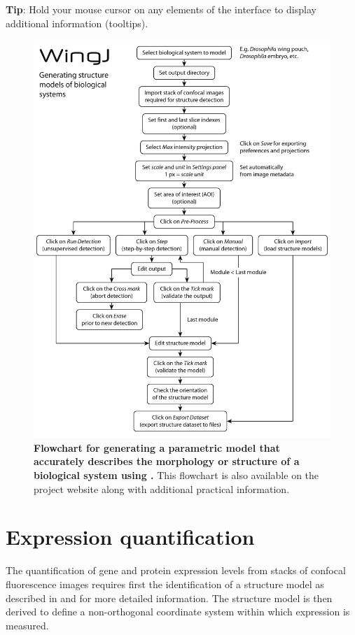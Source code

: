 \textbf{Tip}: Hold your mouse cursor on any elements of the interface to display additional information (tooltips).

\begin{figure}[!h]
\centering
\includegraphics[scale=0.7]{images/structure_detection_flowchart_BW_2.png}
\caption{\textbf{Flowchart for generating a parametric model that accurately describes the morphology or structure of a biological system using \wingj.} This flowchart is also available on the project website along with additional practical information.}
\label{fig:structure_detection_flowchart}
\end{figure}

\section{Expression quantification}
The quantification of gene and protein expression levels from stacks of confocal fluorescence images requires first the identification of a structure model as described in  and  for more detailed information. The structure model is then derived to define a non-orthogonal coordinate system within which expression is measured.\\

